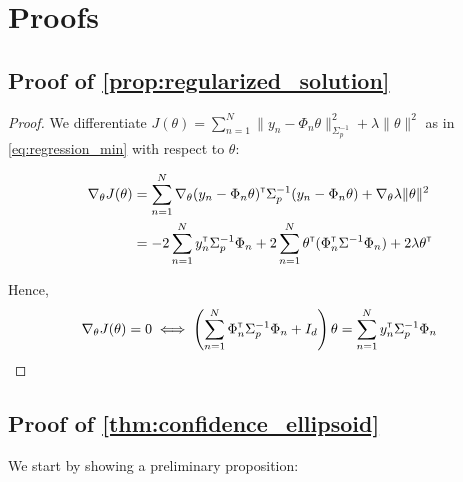 \documentclass{article}
\begin{document}
\clearpage



\clearpage
\appendix

\section{Proofs}

\subsection{Proof of \autoref{prop:regularized_solution}}

\begin{proof}
We differentiate $J(\theta) = \sum_{n=1}^N \|y_n -\Phi_n\theta\|_{\Sigma_p^{-1}}^2 + \lambda\|\theta\|_{}^2$ as in  \eqref{eq:regression_min} with respect to $\theta$:

\begin{align*}
    \nabla_{\theta} J(\theta) &= \sum_{n=1}^N\nabla_{\theta} (y_n - \Phi_n\theta)^{\mathsf{\scriptscriptstyle T}}\Sigma_p^{-1}(y_n - \Phi_n\theta) + \nabla_{\theta} \lambda\|\theta\|_{}^2\\
    &= -2\sum_{n=1}^N y_n^{\mathsf{\scriptscriptstyle T}}\Sigma_p^{-1}\Phi_n + 2\sum_{n=1}^N\theta^{\mathsf{\scriptscriptstyle T}}(\Phi_n^{\mathsf{\scriptscriptstyle T}}\Sigma^{-1}\Phi_n) +  2 \lambda \theta^{\mathsf{\scriptscriptstyle T}}
\end{align*}

Hence,
\begin{align*}
    \nabla_{\theta} J(\theta) = 0 \iff \left(\sum_{n=1}^N\Phi_n^{\mathsf{\scriptscriptstyle T}}\Sigma_p^{-1}\Phi_n + I_d\right)\theta = \sum_{n=1}^N y_n^{\mathsf{\scriptscriptstyle T}}\Sigma_p^{-1}\Phi_n
\end{align*}
\end{proof}

\subsection{Proof of \autoref{thm:confidence_ellipsoid}}

We start by showing a preliminary proposition:
\end{document}
